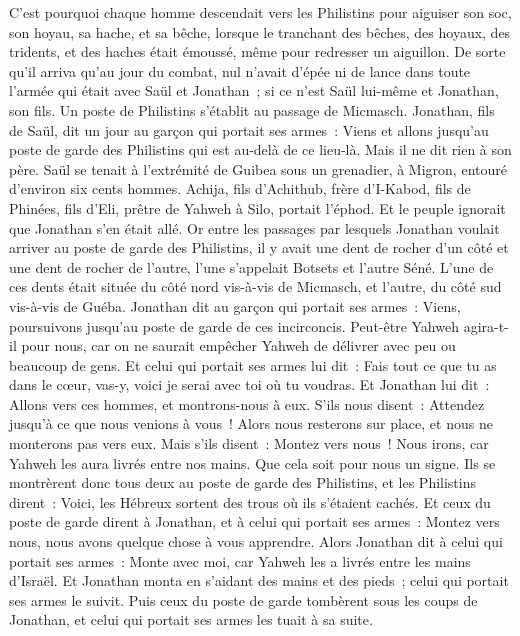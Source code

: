 \begin{multicols}{2}
C'est pourquoi chaque homme descendait vers les Philistins pour aiguiser son soc, son hoyau, sa hache, et sa bêche,
lorsque le tranchant des bêches, des hoyaux, des tridents, et des haches était émoussé, même pour redresser un aiguillon.
De sorte qu'il arriva qu'au jour du combat, nul n'avait d'épée ni de lance dans toute l'armée qui était avec Saül et Jonathan~; si ce n'est Saül lui-même et Jonathan, son fils.
Un poste de Philistins s'établit au passage de Micmasch.
\VerseOne{}Jonathan, fils de Saül, dit un jour au garçon qui portait ses armes~: Viens et allons jusqu'au poste de garde des Philistins qui est au-delà de ce lieu-là. Mais il ne dit rien à son père.
Saül se tenait à l'extrémité de Guibea sous un grenadier, à Migron, entouré d'environ six cents hommes.
Achija, fils d'Achithub, frère d'I-Kabod, fils de Phinées, fils d'Eli, prêtre de Yahweh à Silo, portait l'éphod. Et le peuple ignorait que Jonathan s'en était allé.
Or entre les passages par lesquels Jonathan voulait arriver au poste de garde des Philistins, il y avait une dent de rocher d'un côté et une dent de rocher de l'autre, l'une s'appelait Botsets et l'autre Séné.
L'une de ces dents était située du côté nord vis-à-vis de Micmasch, et l'autre, du côté sud vis-à-vis de Guéba.
Jonathan dit au garçon qui portait ses armes~: Viens, poursuivons jusqu'au poste de garde de ces incirconcis. Peut-être Yahweh agira-t-il pour nous, car on ne saurait empêcher Yahweh de délivrer avec peu ou beaucoup de gens.
Et celui qui portait ses armes lui dit~: Fais tout ce que tu as dans le cœur, vas-y, voici je serai avec toi où tu voudras.
Et Jonathan lui dit~: Allons vers ces hommes, et montrons-nous à eux.
S'ils nous disent~: Attendez jusqu'à ce que nous venions à vous~! Alors nous resterons sur place, et nous ne monterons pas vers eux.
Mais s'ils disent~: Montez vers nous~! Nous irons, car Yahweh les aura livrés entre nos mains. Que cela soit pour nous un signe.
Ils se montrèrent donc tous deux au poste de garde des Philistins, et les Philistins dirent~: Voici, les Hébreux sortent des trous où ils s'étaient cachés.
Et ceux du poste de garde dirent à Jonathan, et à celui qui portait ses armes~: Montez vers nous, nous avons quelque chose à vous apprendre. Alors Jonathan dit à celui qui portait ses armes~: Monte avec moi, car Yahweh les a livrés entre les mains d'Israël.
Et Jonathan monta en s'aidant des mains et des pieds~; celui qui portait ses armes le suivit. Puis ceux du poste de garde tombèrent sous les coups de Jonathan, et celui qui portait ses armes les tuait à sa suite.

\end{multicols}
